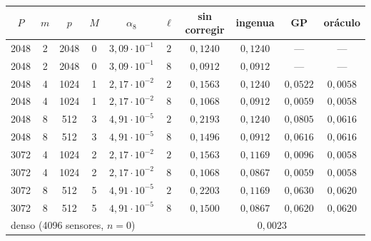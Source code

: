 \begin{tabular}{cccccccccc}
\toprule
$P$ & $m$ & $p$ & $M$ & $\alpha_8$ & $\ell$ & sin corregir & ingenua & GP & oráculo \\
\midrule
2048 & 2 & 2048 & 0 & $3{,}09 \cdot 10^{-1}$ & $2$ & $0{,}1240$ & $0{,}1240$ & --- & --- \\
2048 & 2 & 2048 & 0 & $3{,}09 \cdot 10^{-1}$ & $8$ & $0{,}0912$ & $0{,}0912$ & --- & --- \\
2048 & 4 & 1024 & 1 & $2{,}17 \cdot 10^{-2}$ & $2$ & $0{,}1563$ & $0{,}1240$ & $0{,}0522$ & $0{,}0058$ \\
2048 & 4 & 1024 & 1 & $2{,}17 \cdot 10^{-2}$ & $8$ & $0{,}1068$ & $0{,}0912$ & $0{,}0059$ & $0{,}0058$ \\
2048 & 8 & 512 & 3 & $4{,}91 \cdot 10^{-5}$ & $2$ & $0{,}2193$ & $0{,}1240$ & $0{,}0805$ & $0{,}0616$ \\
2048 & 8 & 512 & 3 & $4{,}91 \cdot 10^{-5}$ & $8$ & $0{,}1496$ & $0{,}0912$ & $0{,}0616$ & $0{,}0616$ \\
\midrule
3072 & 4 & 1024 & 2 & $2{,}17 \cdot 10^{-2}$ & $2$ & $0{,}1563$ & $0{,}1169$ & $0{,}0096$ & $0{,}0058$ \\
3072 & 4 & 1024 & 2 & $2{,}17 \cdot 10^{-2}$ & $8$ & $0{,}1068$ & $0{,}0867$ & $0{,}0059$ & $0{,}0058$ \\
3072 & 8 & 512 & 5 & $4{,}91 \cdot 10^{-5}$ & $2$ & $0{,}2203$ & $0{,}1169$ & $0{,}0630$ & $0{,}0620$ \\
3072 & 8 & 512 & 5 & $4{,}91 \cdot 10^{-5}$ & $8$ & $0{,}1500$ & $0{,}0867$ & $0{,}0620$ & $0{,}0620$ \\
\midrule
\multicolumn{6}{l}{denso (4096 sensores, $n = 0$)} & \multicolumn{4}{c}{$0{,}0023$} \\
\bottomrule
\end{tabular}
